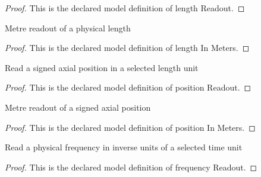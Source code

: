 \begin{proof}
  This is the declared model definition of length Readout.
\end{proof}
\begin{definition}
  \label{def:physics:phyx-mini-0320:phyxminiproblems-problemphyxmini0320-lengthinmeters}
  Metre readout of a physical length
\end{definition}
\begin{proof}
  This is the declared model definition of length In Meters.
\end{proof}
\begin{definition}
  \label{def:physics:phyx-mini-0320:phyxminiproblems-problemphyxmini0320-positionreadout}
  Read a signed axial position in a selected length unit
\end{definition}
\begin{proof}
  This is the declared model definition of position Readout.
\end{proof}
\begin{definition}
  \label{def:physics:phyx-mini-0320:phyxminiproblems-problemphyxmini0320-positioninmeters}
  Metre readout of a signed axial position
\end{definition}
\begin{proof}
  This is the declared model definition of position In Meters.
\end{proof}
\begin{definition}
  \label{def:physics:phyx-mini-0320:phyxminiproblems-problemphyxmini0320-frequencyreadout}
  Read a physical frequency in inverse units of a selected time unit
\end{definition}
\begin{proof}
  This is the declared model definition of frequency Readout.
\end{proof}
